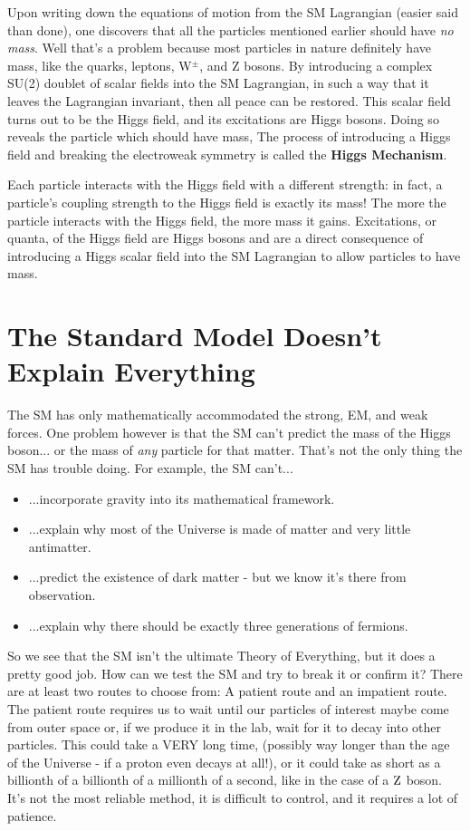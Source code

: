 Upon writing down the equations of motion from the SM Lagrangian (easier said than done), one discovers that all the particles mentioned earlier should have \emph{no mass}.
Well that's a problem because most particles in nature definitely have mass, like the quarks, leptons, W$^{\pm}$, and Z bosons.
By introducing a complex SU(2) doublet of scalar fields into the SM Lagrangian, in such a way that it leaves the Lagrangian invariant, then all peace can be restored.
This scalar field turns out to be the Higgs field, and its excitations are Higgs bosons.
Doing so reveals the particle which should have mass,
The process of introducing a Higgs field and breaking the electroweak symmetry is called the {\bf Higgs Mechanism}.

Each particle interacts with the Higgs field with a different strength: in fact, a particle's coupling strength to the Higgs field is exactly its mass! 
The more the particle interacts with the Higgs field, the more mass it gains.
Excitations, or quanta, of the Higgs field are Higgs bosons and are a direct consequence of introducing a Higgs scalar field into the SM Lagrangian to allow particles to have mass.

\section{The Standard Model Doesn't Explain Everything}
The SM has only mathematically accommodated the strong, EM, and weak forces.
One problem however is that the SM can't predict the mass of the Higgs boson... or the mass of \emph{any} particle for that matter.
That's not the only thing the SM has trouble doing. 
For example, the SM can't...
\begin{itemize}
    \item ...incorporate gravity into its mathematical framework.
    \item ...explain why most of the Universe is made of matter and very little antimatter.
    \item ...predict the existence of dark matter - but we know it's there from observation.
    \item ...explain why there should be exactly three generations of fermions. 
\end{itemize}

So we see that the SM isn't the ultimate Theory of Everything, but it does a pretty good job. 
How can we test the SM and try to break it or confirm it?
There are at least two routes to choose from:
A patient route and an impatient route.
The patient route requires us to wait until our particles of interest
maybe come from outer space or, if we produce it in the lab, 
wait for it to decay into other particles. 
This could take a VERY long time, (possibly way longer than the age of the Universe - if a proton even decays at all!),
or it could take as short as a billionth of a billionth of a millionth of a second, 
like in the case of a ${\rm Z}$ boson.
It's not the most reliable method, it is difficult to control, and it requires a lot of patience.

